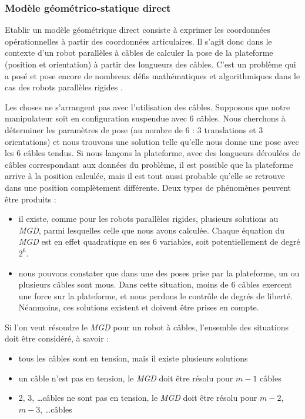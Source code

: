 \subsubsection{Modèle géométrico-statique direct}

Etablir un modèle géométrique direct consiste à exprimer les coordonnées opérationnelles à partir des coordonnées articulaires. Il s'agit donc dans le contexte d'un robot parallèles à câbles de calculer la pose de la plateforme (position et orientation) à partir des longueurs des câbles. C'est un problème qui a posé et pose encore de nombreux défis mathématiques et algorithmiques dans le cas des robots parallèles rigides \cite{merlet1997robots}.

Les choses ne s'arrangent pas avec l'utilisation des câbles. Supposons que notre manipulateur soit en configuration suspendue avec $6$ câbles. Nous cherchons à déterminer les paramètres de pose (au nombre de $6$ : $3$ translations et $3$ orientations) et nous trouvons une solution telle qu'elle nous donne une pose avec les $6$ câbles tendus. Si nous lançons la plateforme, avec des longueurs déroulées de câbles correspondant aux données du problème, il est possible que la plateforme arrive à la position calculée, mais il est tout aussi probable qu'elle se retrouve dans une position complètement différente. Deux types de phénomènes peuvent être produits :
\begin{itemize}
 \item il existe, comme pour les robots parallèles rigides, plusieurs solutions au {\it MGD}, parmi lesquelles celle que nous avons calculée. Chaque équation du {\it MGD} est en effet quadratique en ses $6$ variables, soit potentiellement de degré $2^6$. 
 \item nous pouvons constater que dans une des poses prise par la plateforme, un ou plusieurs câbles sont mous. Dans cette situation, moins de 6 câbles exercent une force sur la plateforme, et nous perdons le contrôle de degrés de liberté. Néanmoins, ces solutions existent et doivent être prises en compte.
\end{itemize}

Si l'on veut résoudre le {\it MGD} pour un robot à câbles, l'ensemble des situations doit être considéré, à savoir :
\begin{itemize}
 \item tous les câbles sont en tension, mais il existe plusieurs solutions
 \item un câble n'est pas en tension, le {\it MGD} doit être résolu pour $m-1$ câbles
 \item 2, 3, \dots câbles ne sont pas en tension, le {\it MGD} doit être résolu pour $m-2$, $m-3$, \dots câbles
\end{itemize}

